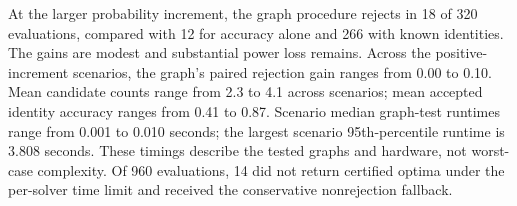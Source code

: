 At the larger probability increment, the graph procedure rejects in 18 of 320 evaluations, compared with 12 for accuracy alone and 266 with known identities. The gains are modest and substantial power loss remains.
Across the positive-increment scenarios, the graph's paired rejection gain ranges from 0.00 to 0.10. Mean candidate counts range from 2.3 to 4.1 across scenarios; mean accepted identity accuracy ranges from 0.41 to 0.87.
Scenario median graph-test runtimes range from 0.001 to 0.010 seconds; the largest scenario 95th-percentile runtime is 3.808 seconds. These timings describe the tested graphs and hardware, not worst-case complexity.
Of 960 evaluations, 14 did not return certified optima under the per-solver time limit and received the conservative nonrejection fallback.
